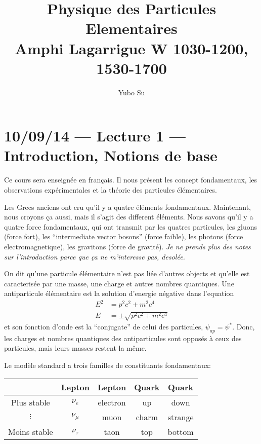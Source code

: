 \documentclass[10pt]{report}
\begin{document}
\title{Physique des Particules Elementaires\\ Amphi Lagarrigue W 1030-1200, 1530-1700}
\author{Yubo Su}
\date{}

\maketitle
\tableofcontents

\chapter{10/09/14 --- Lecture 1 --- Introduction, Notions de base}

Ce cours sera enseign\'ee en fran\c{c}ais. Il nous pr\'esent les concept fondamentaux, les observations exp\'erimentales et la th\'eorie des particules \'el\'ementaires.

Les Grecs anciens ont cru qu'il y a quatre \'el\'ements fondamentaux. Maintenant, nous croyons \c{c}a aussi, mais il s'agit des different \'el\'ements. Nous savons qu'il y a quatre force fondamentaux, qui ont transmit par les quatres particules, les gluons (force fort), les ``intermediate vector bosons'' (force faible), les photons (force electromagnetique), les gravitons (force de gravit\'e). \emph{Je ne prends plus des notes sur l'introduction parce que \c{c}a ne m'interesse pas, desol\'ee.}

On dit qu'une particule \'el\'ementaire n'est pas li\'ee d'autres objects et qu'elle est caracteris\'ee par une masse, une charge et autres nombres quantiques. Une antiparticule \'el\'ementaire est la solution d'energie n\'egative dans l'equation
\begin{align}
    E^2 &= p^2c^2 + m^2c^4\\
    E &= \pm \sqrt{p^2 c^2 + m^2c^4}
\end{align}
et son fonction d'onde est la ``conjugate'' de celui des particules, $\psi_{ap} = \psi^*$. Donc, les charges et nombres quantiques des antiparticules sont oppos\'es \`a ceux des particules, mais leurs masses restent la m\^eme.

Le mod\`ele standard a trois familles de constituants fondamentaux:
\begin{table}[!h]
    \centering
    \begin{tabular}{c|c|c|c|c}
        &Lepton & Lepton & Quark & Quark\\\hline
        Plus stable&$\nu_e$& electron& up & down \\
        $\vdots$&$\nu_\mu$& muon& charm & strange \\
        Moins stable&$\nu_\tau$& taon& top & bottom 
    \end{tabular}
\end{table}
\end{document}
